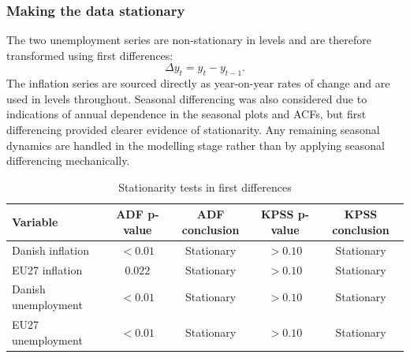 




\subsubsection{Making the data stationary}

The two unemployment series are non-stationary in levels and are therefore transformed 
using first differences:
\[
\Delta y_t = y_t - y_{t-1}.
\]
The inflation series are sourced directly as year-on-year rates of change and are used 
in levels throughout. Seasonal differencing was also considered due to indications of 
annual dependence in the seasonal plots and ACFs, but first differencing provided 
clearer evidence of stationarity. Any remaining seasonal dynamics are handled in the 
modelling stage rather than by applying seasonal differencing mechanically.

\begin{table}[H]
\centering
\caption{Stationarity tests in first differences}
\begin{tabular}{lcccc}
\hline
Variable & ADF p-value & ADF conclusion & KPSS p-value & KPSS conclusion \\
\hline
Danish inflation      & $<0.01$ & Stationary & $>0.10$ & Stationary \\
EU27 inflation        & $0.022$ & Stationary & $>0.10$ & Stationary \\
Danish unemployment   & $<0.01$ & Stationary & $>0.10$ & Stationary \\
EU27 unemployment     & $<0.01$ & Stationary & $>0.10$ & Stationary \\
\hline
\end{tabular}
\label{tab:stationarity_differences}
\end{table}

